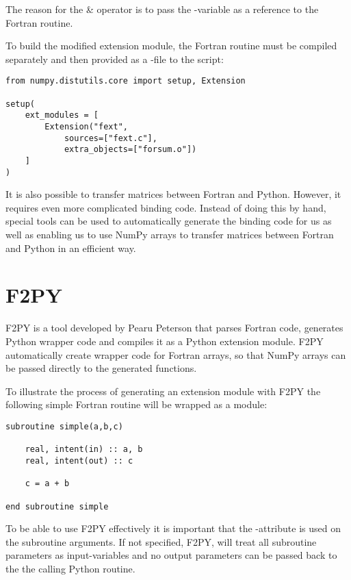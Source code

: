 The reason for the \& operator is to pass the -variable as a reference to the Fortran routine.

To build the modified extension module, the Fortran routine must be compiled separately and then provided as a -file to the  script:

\pymode

\begin{lstlisting}
from numpy.distutils.core import setup, Extension

setup(
	ext_modules = [
		Extension("fext",
			sources=["fext.c"],
			extra_objects=["forsum.o"])
	]
)
\end{lstlisting}

It is also possible to transfer matrices between Fortran and Python. However, it requires even more complicated binding code. Instead of doing this by hand, special tools can be used to automatically generate the binding code for us as well as enabling us to use NumPy arrays to transfer matrices between Fortran and Python in an efficient way.

\section{F2PY}

F2PY is a tool developed by Pearu Peterson that parses Fortran code, generates Python wrapper code and compiles it as a Python extension module. F2PY automatically create wrapper code for Fortran arrays, so that NumPy arrays can be passed directly to the generated functions. 

To illustrate the process of generating an extension module with F2PY the following simple Fortran routine will be wrapped as a module:

\fmode

\begin{lstlisting}
subroutine simple(a,b,c)

	real, intent(in) :: a, b
	real, intent(out) :: c

	c = a + b

end subroutine simple
\end{lstlisting}

To be able to use F2PY effectively it is important that the -attribute is used on the subroutine arguments. If not specified, F2PY, will treat all subroutine parameters as input-variables and no output parameters can be passed back to the the calling Python routine.

